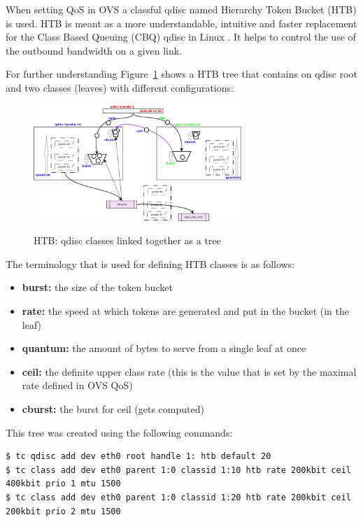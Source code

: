 When setting QoS in OVS a classful qdisc named Hierarchy Token Bucket (HTB) is used. HTB is meant as a more understandable, intuitive and faster replacement for the Class Based Queuing (CBQ) qdisc in Linux \cite{htb-guide}. It helps to control the use of the outbound bandwidth on a given link. 


For further understanding Figure~\ref{fig:htb} shows a HTB tree that contains on qdisc root and two classes (leaves) with different configurations:

\begin{figure}[H]

\centering
\includegraphics[width=0.7\textwidth]{images/fundamentals/htb_qdisc.png}
\caption{HTB: qdisc classes linked together as a tree} \cite{htb-qdiscs} \label{fig:htb}
\end{figure}

The terminology that is used for defining HTB classes is as follows:
\begin{itemize}
\item \textbf{burst:} the size of the token bucket
\item \textbf{rate:} the speed at which tokens are generated and put in the bucket (in the leaf)
\item \textbf{quantum:} the amount of bytes to serve from a single leaf at once
\item \textbf{ceil:} the definite upper class rate (this is the value that is set by the maximal rate defined in OVS QoS)
\item \textbf{cburst:} the burst for ceil (gets computed)
\end{itemize}

This tree was created using the following commands:
\begin{lstlisting}[language=commands]
$ tc qdisc add dev eth0 root handle 1: htb default 20
$ tc class add dev eth0 parent 1:0 classid 1:10 htb rate 200kbit ceil 400kbit prio 1 mtu 1500
$ tc class add dev eth0 parent 1:0 classid 1:20 htb rate 200kbit ceil 200kbit prio 2 mtu 1500
\end{lstlisting}

